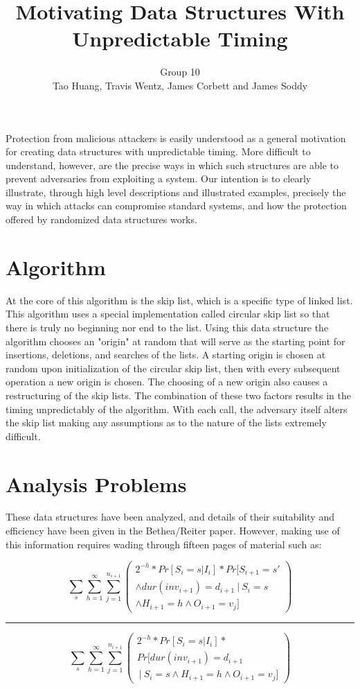 \documentclass[11pt,twocolumn]{article}
\title{Motivating Data Structures With Unpredictable Timing}
\author{Group 10\\
\small{Tao Huang, Travis Wentz, James Corbett and James Soddy}}
\begin{document}
\maketitle

Protection from malicious attackers is easily understood as a general motivation
for creating data structures with unpredictable timing. More difficult to understand,
however, are the precise ways in which such structures are able to prevent adversaries
from exploiting a system. Our intention is to clearly illustrate, through
high level descriptions and illustrated examples, precisely the way in which attacks
can compromise standard systems, and how the protection offered by randomized
data structures works.

\section{Algorithm}
 At the core of this algorithm is the skip list, which is a specific type of linked list. This algorithm uses a special implementation called circular skip list so that there is truly no beginning nor end to the list. Using this data structure the algorithm chooses an "origin" at random that will serve as the starting point for insertions, deletions, and searches of the lists. A starting origin is chosen at random upon initialization of the circular skip list, then with every subsequent operation a new origin is chosen. The choosing of a new origin also causes a restructuring of the skip lists. The combination of these two factors results in the timing unpredictably of the algorithm. With each call, the adversary itself alters the skip list making any assumptions as to the nature of the lists extremely difficult.
  
\section{Analysis Problems}
These data structures have been analyzed, and details of their suitability and
efficiency have been given in the Bethea/Reiter paper\cite{Bethea09}. However,
making use of this information requires wading through fifteen pages of material such as:

\begin{minipage}{.5\textwidth}

$$\sum_s\sum_{h=1}^\infty\sum_{j=1}^{n_{i+1}} \left( \begin{matrix}
2^{-h}*Pr[S_i=s | I_i]*Pr[S_{i+1}=s' \\ \land dur(inv_{i+1})=d_{i+1}\  
|\  S_i=s \\ \land H_{i+1}=h \land O_{i+1}=v_j] \end{matrix} \right)$$
\hrule
$$\sum_s\sum_{h=1}^\infty\sum_{j=1}^{n_{i+1}} 
\left( \begin{matrix}2^{-h}*Pr[S_i=s | I_i]*
\\Pr[ dur(inv_{i+1})=d_{i+1} \\ \  | \  S_i=s \land H_{i+1}=h \land O_{i+1}=v_j] \end{matrix} \right)$$

\end{minipage}
\end{document}
